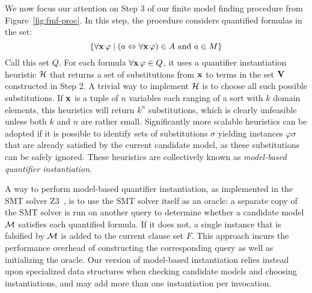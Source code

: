 \documentclass{svjour3}                     %
\begin{document}
We now focus our attention on Step 3 of our finite model finding procedure \fmsolve
from Figure~\ref{fig:fmf-proc}.
In this step, the procedure \fmsolve considers quantified formulas in the set:
%
\begin{equation} \label{eq:q}
\{ \forall \mathbf{x}\,\varphi \mid (a \Leftrightarrow \forall \mathbf{x}\,\varphi) \in A \text{ and } a \in M\}
\end{equation}
%
Call this set $Q$.
For each formula $\forall \mathbf{x}\,\varphi \in Q$, it uses a quantifier instantiation heuristic $\mathcal{H}$
that returns a set of substitutions from $\mathbf{x}$ to terms in the set $\mathbf{V}$ constructed in Step 2.
A trivial way to implement $\mathcal{H}$ is to choose all such possible substitutions.
If $\mathbf{x}$ is a tuple of $n$ variables each ranging of a sort with $k$ domain elements, 
this heuristics will return $k^n$ substitutions, 
which is clearly unfeasible unless both $k$ and $n$ are rather small.
Significantly more scalable heuristics can be adopted 
if it is possible to identify sets of substitutions $\sigma$ yielding 
instances $\varphi\sigma$ that are already satisfied by the current candidate model, 
as these substitutions can be safely ignored.
These heuristics are collectively known as \emph{model-based quantifier instantiation}.

A way to perform model-based quantifier instantiation, 
as implemented in the SMT solver Z3~\cite{GeDeM-CAV-09},
is to use the SMT solver itself as an oracle:
a separate copy of the SMT solver is run on another query to determine 
whether a candidate model $\mathcal{M}$ satisfies each quantified formula.
If it does not, a single instance that is falsified by $\mathcal{M}$ is added
to the current clause set $F$.
This approach incurs the performance overhead of constructing the corresponding query 
as well as initializing the oracle.
Our version of model-based instantiation relies instead upon specialized data structures 
when checking candidate models and choosing instantiations,
and may add more than one instantiation per invocation.
\end{document}
